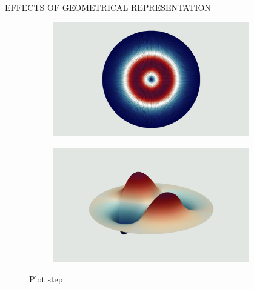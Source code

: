 \documentclass[debug]{beamer} %
\newlength{\columnheight}
\begin{document}
\begin{frame}
\begin{columns}
\begin{column}{0.45\textwidth}
{\begin{block}{\boxnumber EFFECTS OF GEOMETRICAL REPRESENTATION}
\begin{figure}[hb]
\begin{mdframed}[backgroundcolor=bggrey]
					\begin{subfigure}[b]{.4999\textwidth}
						\centering
						\includegraphics[width=1\linewidth]{images/et3posterStepFiber.png}%
					\end{subfigure}\hfill
					\begin{subfigure}[b]{.4999\textwidth}
						\centering
						\includegraphics[width=1\linewidth]{images/ez3posterStepFiber.png}%
					\end{subfigure}
				\end{mdframed}
				\caption{Plot step}
				\label{fig:plot-step}
			\end{figure}
        \end{block}

        \vfill

      } %
    \end{column}

    \begin{column}{0.45\textwidth}
      \parbox[t][\columnheight]{\textwidth}{

}
\end{column}
\end{columns}
\end{frame}
\end{document}
